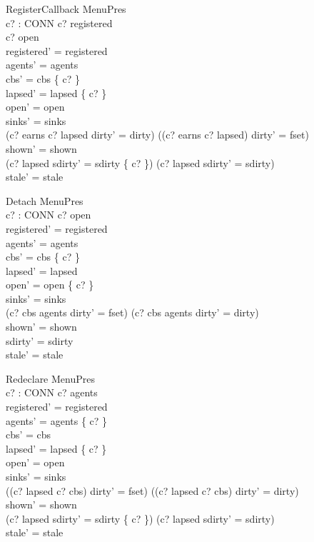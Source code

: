\documentclass[a4paper,10pt,fleqn]{article}
\begin{document}
\begin{schema}{RegisterCallback}
  \Delta MenuPres \\
  c? : CONN
\where
  c? \in registered \\
  c? \in open \\
  registered' = registered \\
  agents' = agents \\
  cbs' = cbs \cup \{ c? \} \\
  lapsed' = lapsed \setminus \{ c? \} \\
  open' = open \\
  sinks' = sinks \\
  (c? \in earns \land c? \notin lapsed \land dirty' = dirty) \lor
    ((c? \notin earns \lor c? \in lapsed) \land dirty' = fset) \\
  shown' = shown \\
  (c? \in lapsed \land sdirty' = sdirty \cup \{ c? \}) \lor
    (c? \notin lapsed \land sdirty' = sdirty) \\
  stale' = stale
\end{schema}

\begin{schema}{Detach}
  \Delta MenuPres \\
  c? : CONN
\where
  c? \in open \\
  registered' = registered \\
  agents' = agents \\
  cbs' = cbs \setminus \{ c? \} \\
  lapsed' = lapsed \\
  open' = open \setminus \{ c? \} \\
  sinks' = sinks \\
  (c? \in cbs \setminus agents \land dirty' = fset) \lor
    (c? \notin cbs \setminus agents \land dirty' = dirty) \\
  shown' = shown \\
  sdirty' = sdirty \\
  stale' = stale
\end{schema}

\begin{schema}{Redeclare}
  \Delta MenuPres \\
  c? : CONN
\where
  c? \in agents \\
  registered' = registered \\
  agents' = agents \setminus \{ c? \} \\
  cbs' = cbs \\
  lapsed' = lapsed \setminus \{ c? \} \\
  open' = open \\
  sinks' = sinks \\
  ((c? \in lapsed \lor c? \notin cbs) \land dirty' = fset) \lor
    (\lnot (c? \in lapsed \lor c? \notin cbs) \land dirty' = dirty) \\
  shown' = shown \\
  (c? \in lapsed \land sdirty' = sdirty \cup \{ c? \}) \lor
    (c? \notin lapsed \land sdirty' = sdirty) \\
  stale' = stale
\end{schema}
\end{document}

